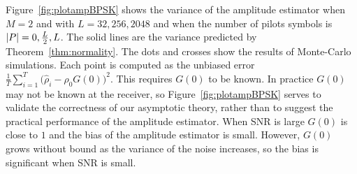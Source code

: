 \documentclass[journal]{IEEEtran}
\begin{document}
Figure~\ref{fig:plotampBPSK} %
shows the variance of the amplitude estimator when $M=2$ and with $L=32, 256, 2048$ and when the number of pilots symbols is ${\left\vert P \right\vert} = 0, \tfrac{L}{2}, L$.  The solid lines are the variance predicted by Theorem~\ref{thm:normality}.  The dots and crosses show the results of Monte-Carlo simulations.  Each point is computed as the unbiased error $\tfrac{1}{T}\sum_{i=1}^T\big(\hat{\rho}_i - \rho_0G(0)\big)^2$.  This requires $G(0)$ to be known.  In practice $G(0)$ may not be known at the receiver, so Figure~\ref{fig:plotampBPSK} %
serves to validate the correctness of our asymptotic theory, rather than to suggest the practical performance of the amplitude estimator.  When SNR is large $G(0)$ is close to $1$ and the bias of the amplitude estimator is small.  However, $G(0)$ grows without bound as the variance of the noise increases, so the bias is significant when SNR is small.  %
\end{document}
